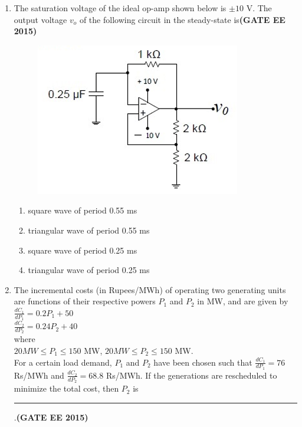 \documentclass[a4paper,12pt]{exam}
\theoremstyle{remark}
\begin{document}
\begin{enumerate}
\item The saturation voltage of the ideal op-amp shown below is $\pm 10$ V. The output voltage $v_o$ of the following circuit in the steady-state is\hfill{\textbf{(GATE EE 2015)}}
\begin{figure}[H]
    \centering
    \includegraphics[width=0.5\columnwidth]{figs/2Q 49.png}
    \caption{}
    \label{fig:placeholder}
\end{figure}
\begin{multicols}{2}
    \begin{enumerate}
        \item square wave of period 0.55 ms
        \item triangular wave of period 0.55 ms
        \item square wave of period 0.25 ms
        \item triangular wave of period 0.25 ms
    \end{enumerate}
\end{multicols}
\item The incremental costs (in Rupees/MWh) of operating two generating units are functions of their respective powers $P_1$ and $P_2$ in MW, and are given by\\
$\frac{dC_1}{dP_1}=0.2P_1+50$\\
$\frac{dC_2}{dP_2}=0.24P_2+40$\\
where\\ $20MW \leq P_1 \leq 150$ MW, $20MW \leq P_2 \leq 150$ MW.\\
For a certain load demand, $P_1$ and $P_2$ have been chosen such that $\frac{dC_1}{dP_1}=76$ Rs/MWh and $\frac{dC_2}{dP_2}=68.8$ Rs/MWh. If the generations are rescheduled to minimize the total cost, then $P_2$ is \rule{2cm}{0.15mm}.\hfill{\textbf{(GATE EE 2015)}}


\end{enumerate}
\end{document}
